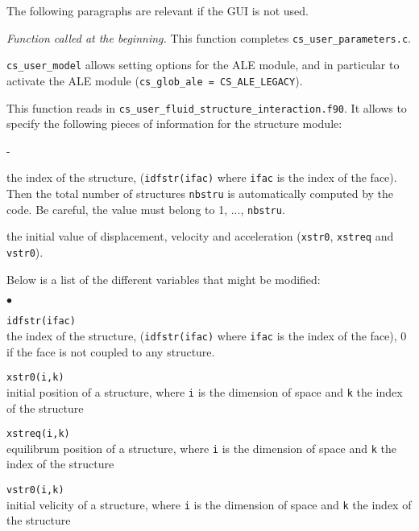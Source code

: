 The following paragraphs are relevant if the GUI is not used.

\noindent
\textit{Function called at the beginning.}
This function completes \texttt{cs\_user\_parameters.c}.

\texttt{cs\_user\_model} allows setting options for the ALE module, and in
particular to activate the ALE module (\texttt{cs\_glob\_ale = CS\_ALE\_LEGACY}).


This function reads in \texttt{cs\_user\_fluid\_structure\_interaction.f90}. It allows to specify the following pieces of information for the structure module:
\begin{list}{-}{}
  \item the index of the structure, (\texttt{idfstr(ifac)} where \texttt{ifac} is the index of the face). Then the total number of structures \texttt{nbstru} is automatically computed by the code. Be careful, the value must belong to 1, ..., \texttt{nbstru}.
  \item the initial value of displacement, velocity and acceleration
    (\texttt{xstr0}, \texttt{xstreq} and \texttt{vstr0}).
\end{list}

Below is a list of the different variables that might be modified:

\begin{list}{$\bullet$}{}

\item{\texttt{idfstr(ifac)}} \\
{the index of the structure, (\texttt{idfstr(ifac)} where \texttt{ifac} is the index of the face), 0 if the face is not coupled to any structure.}

\item{\texttt{xstr0(i,k)}} \\
{initial position of a structure, where \texttt{i} is the dimension of space
and \texttt{k} the index of the structure}

\item{\texttt{xstreq(i,k)}} \\
{equilibrum position of a structure, where \texttt{i} is the dimension of space
and \texttt{k} the index of the structure}

\item{\texttt{vstr0(i,k)}} \\
{initial velicity of a structure, where \texttt{i} is the dimension of space
and \texttt{k} the index of the structure }
\end{list}

